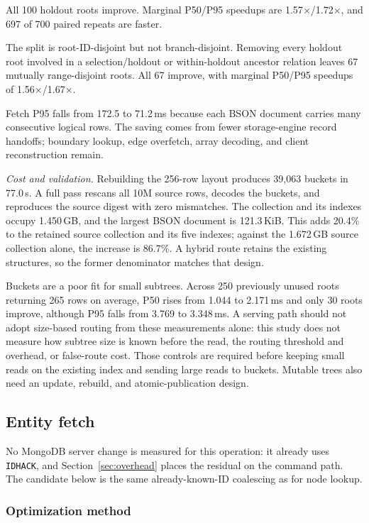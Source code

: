 \documentclass[10pt]{article}
\newcommand{\code}[1]{\texttt{#1}}
\begin{document}
All 100 holdout roots improve. Marginal P50/P95 speedups are
1.57$\times$/1.72$\times$, and 697 of 700 paired repeats are faster.

The split is root-ID-disjoint but not branch-disjoint. Removing every holdout
root involved in a selection/holdout or within-holdout ancestor relation leaves
67 mutually range-disjoint roots. All 67 improve, with marginal P50/P95
speedups of 1.56$\times$/1.67$\times$.

Fetch P95 falls from 172.5 to 71.2\,ms because each BSON document carries many
consecutive logical rows. The saving comes from fewer storage-engine record
handoffs; boundary lookup, edge overfetch, array decoding, and client
reconstruction remain.

\textit{Cost and validation.} Rebuilding the 256-row layout produces
39{,}063 buckets in 77.0\,s. A full pass rescans all 10M source rows, decodes
the buckets, and reproduces the source digest with zero mismatches. The
collection and its indexes occupy 1.450\,GB, and the largest BSON document is
121.3\,KiB. This adds 20.4\% to the retained source collection and its five
indexes; against the 1.672\,GB source collection alone, the increase is
86.7\%. A hybrid route retains the existing structures, so the former
denominator matches that design.

Buckets are a poor fit for small subtrees. Across 250 previously unused roots
returning 265 rows on average, P50 rises from 1.044 to 2.171\,ms and only 30
roots improve, although P95 falls from 3.769 to 3.348\,ms. A serving path should
not adopt size-based routing from these measurements alone: this study does not
measure how subtree size is known before the read, the routing threshold and
overhead, or false-route cost. Those controls are required before keeping small
reads on the existing index and sending large reads to buckets. Mutable trees
also need an update, rebuild, and atomic-publication design.

\subsection{Entity fetch}\label{sec:opt-entity}

No MongoDB server change is measured for this operation: it already uses
\code{IDHACK}, and Section~\ref{sec:overhead} places the residual on the
command path. The candidate below is the same already-known-ID coalescing as
for node lookup.

\subsubsection{Optimization method}
\end{document}
